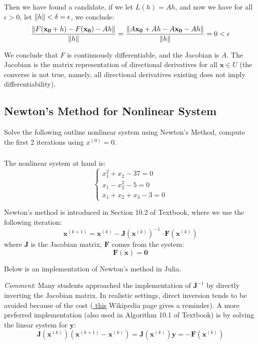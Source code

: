 \documentclass[12pt]{article} %
\newcommand{\1}[1]{\mathds{1}\left[#1\right]}
\newcommand{\eps}{\epsilon}
\begin{document}
Then we have found a candidate, if we let $L(h) = Ah$, and now we have for all $\eps>0$, let $\norm{h}<\delta=\eps$, we conclude:
$$
	\frac{\norm{F(\mathbf{x_0}+h) - F(\mathbf{x_0}) - Ah}}{\norm{h}} = \frac{\norm{A\mathbf{x_0} +Ah- A\mathbf{x_0} - Ah}}{\norm{h}} = 0<\eps
$$

We conclude that $F$ is continuously differentiable, and the Jacobian is $A$. The Jacobian is the matrix representation of directional derivatives for all $\mathbf{x}\in U$ (the converse is not true, namely, all directional derivatives existing does not imply differentiability).



\subsection{Newton's Method for Nonlinear System}
Solve the following outline nonlinear system using Newton's Method, compute the first 2 iterations using $x^{(0)} = 0$.
\subsubsection{}
The nonlinear system at hand is:
$$
	\begin{cases}
		x_1^2 + x_2 - 37 = 0\\
		x_1 - x_2^2 - 5 = 0\\
		x_1 + x_2 +x_3 - 3 = 0
	\end{cases}
$$

Newton's method is introduced in Section 10.2 of Textbook, where we use the following iteration:
$$
	\mathbf{x}^{(k+1)} = \mathbf{x}^{(k)} - \mathbf{J}(\mathbf{x}^{(k)})^{-1} \cdot \mathbf{F}(\mathbf{x}^{(k)})
$$ where $\mathbf{J}$ is the Jacobian matrix, $\mathbf{F}$ comes from the system:
$$
	\mathbf{F}(\mathbf{x}) = \mathbf{0}
$$

Below is an implementation of Newton's method in Julia. 

\emph{Comment}: Many students approached the implementation of $\mathbf{J}^{-1}$ by directly inverting the Jacobian matrix. In realistic settings, direct inversion tends to be avoided because of the cost (\href{https://en.wikipedia.org/wiki/Computational_complexity_of_mathematical_operations}{{\color{blue} this}} Wikipedia page gives a reminder). A more preferred implementation (also used in Algorithm 10.1 of Textbook) is by solving the linear system for $\mathbf{y}$:
$$
	\mathbf{J}(\mathbf{x}^{(k)})(\mathbf{x}^{(k+1)} - \mathbf{x}^{(k)}) =\mathbf{J}(\mathbf{x}^{(k)})\mathbf{y}= -\mathbf{F}(\mathbf{x}^{(k)})
$$ 
\end{document}
